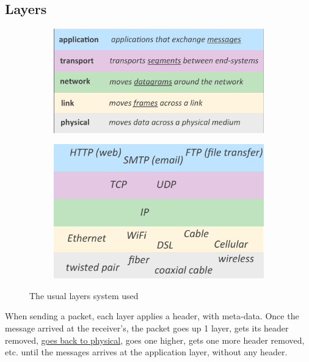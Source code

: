 \documentclass[12pt,a4paper]{article}
\begin{document}
\subsection{Layers}
\begin{figure}[!h]
	\centering
	\begin{subfigure}[b]{0.5\textwidth}
		\includegraphics[scale=0.21]{images/layer_Name}
	\end{subfigure}
	\begin{subfigure}[b]{0.4\textwidth}
		\includegraphics[scale=0.21]{images/layer_Protocol}
	\end{subfigure}
	\caption{The usual layers system used}
	\label{figs: layers}
\end{figure}
When sending a packet, each layer applies a header, with meta-data. Once the message arrived at the receiver's, the packet goes up 1 layer, gets its header removed, \uline{goes back to physical}, goes one higher, gets one more header removed, etc. until the messages arrives at the application layer, without any header.
\end{document}
